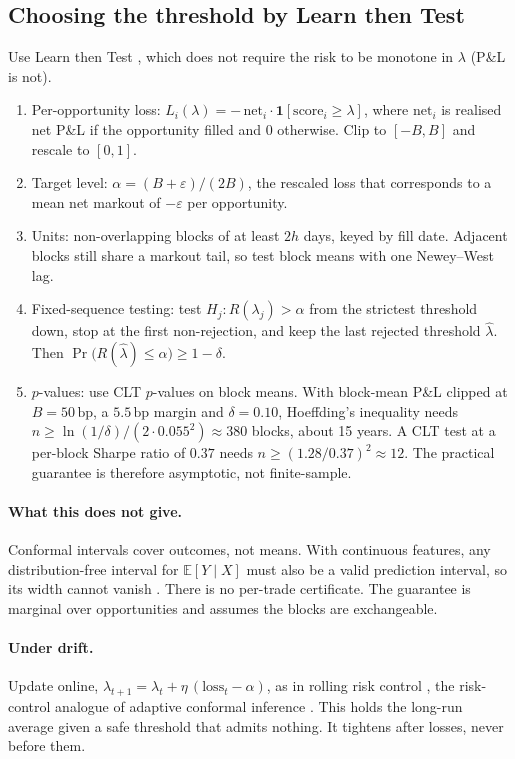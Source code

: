 \documentclass[11pt,letterpaper]{article}
\newcommand{\E}{\mathbb{E}}
\newcommand{\ind}[1]{\mathbf{1}\!\left[#1\right]}
\newcommand{\bp}{\,\mathrm{bp}}
\begin{document}
\subsection{Choosing the threshold by Learn then Test}
Use Learn then Test \cite{ltt}, which does not require the risk to be monotone in $\lambda$ (P\&L is not).
\begin{enumerate}[itemsep=2pt,topsep=2pt]
\item Per-opportunity loss: $L_i(\lambda)=-\,\mathrm{net}_i\cdot\ind{\mathrm{score}_i\ge\lambda}$, where $\mathrm{net}_i$ is realised net P\&L if the opportunity filled and $0$ otherwise. Clip to $[-B,B]$ and rescale to $[0,1]$.
\item Target level: $\alpha=(B+\varepsilon)/(2B)$, the rescaled loss that corresponds to a mean net markout of $-\varepsilon$ per opportunity.
\item Units: non-overlapping blocks of at least $2h$ days, keyed by fill date. Adjacent blocks still share a markout tail, so test block means with one Newey--West lag.
\item Fixed-sequence testing: test $H_j:R(\lambda_j)>\alpha$ from the strictest threshold down, stop at the first non-rejection, and keep the last rejected threshold $\hat\lambda$. Then $\Pr\bigl(R(\hat\lambda)\le\alpha\bigr)\ge1-\delta$.
\item $p$-values: use CLT $p$-values on block means. With block-mean P\&L clipped at $B=50\bp$, a $5.5\bp$ margin and $\delta=0.10$, Hoeffding's inequality needs $n\ge\ln(1/\delta)/(2\cdot0.055^2)\approx380$ blocks, about 15 years. A CLT test at a per-block Sharpe ratio of $0.37$ needs $n\ge(1.28/0.37)^2\approx12$. The practical guarantee is therefore asymptotic, not finite-sample.
\end{enumerate}

\paragraph{What this does not give.} Conformal intervals cover outcomes, not means. With continuous features, any distribution-free interval for $\E[Y\mid X]$ must also be a valid prediction interval, so its width cannot vanish \cite{lb2021}. There is no per-trade certificate. The guarantee is marginal over opportunities and assumes the blocks are exchangeable.

\paragraph{Under drift.} Update online, $\lambda_{t+1}=\lambda_t+\eta\,(\mathrm{loss}_t-\alpha)$, as in rolling risk control \cite{frbr}, the risk-control analogue of adaptive conformal inference \cite{gc2021}. This holds the long-run average given a safe threshold that admits nothing. It tightens after losses, never before them.
\end{document}
